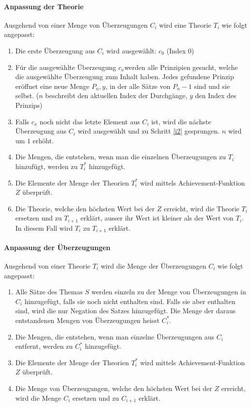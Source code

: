 \documentclass{article}
\begin{document}
\paragraph{Anpassung der Theorie}
Ausgehend von einer Menge von Überzeugungen $C_i$ wird eine Theorie $T_i$ wie folgt angepasst: 
\begin{enumerate}
    \item \label{i1} Die erste Überzeugung aus $C_i$ wird ausgewählt: $c_0$ (Index 0)
    \item \label{i2} Für die ausgewählte Überzeugung $c_x$werden alle Prinzipien gesucht, welche die ausgewählte Überzeugung zum Inhalt haben. Jedes gefundene Prinzip eröffnet eine neue Menge $P_n,y$, in der alle Sätze von $P_n-1$ sind und sie selbst. ($n$ beschreibt den aktuellen Index der Durchgänge, $y$ den Index des Prinzips)
    \item \label{i3} Falls $c_x$ noch nicht das letzte Element aus $C_i$ ist, wird die nächste Überzeugung aus $C_i$ wird ausgewählt und zu Schritt \ref{i2} gesprungen. $n$ wird um $1$ erhöht.
    \item \label{i3} Die Mengen, die entstehen, wenn man die einzelnen Überzeugungen zu $T_i$ hinzufügt, werden zu $T_i^*$ hinzugefügt.
    \item \label{i4}Die Elemente der Menge der Theorien $T_i^*$ wird mittels Achievement-Funktion $Z$ überprüft.
    \item \label{i5}Die Theorie, welche den höchsten Wert bei der $Z$ erreicht, wird die Theorie $T_i$ ersetzen und zu $T_{i+1}$ erklärt, ausser ihr Wert ist kleiner als der Wert von $T_i$. In diesem Fall wird $T_i$ zu $T_{i+1}$ erklärt.
\end{enumerate}

\paragraph{Anpassung der Überzeugungen}
Ausgehend von einer Theorie $T_i$ wird die Menge der Überzeugungen $C_i$ wie folgt angepasst:
\begin{enumerate}
    \item \label{i1} Alle Sätze des Themas $S$ werden einzeln zu der Menge von Überzeugungen in $C_i$ hinzugefügt, falls sie noch nicht enthalten sind. Falls sie aber enthalten sind, wird die nur Negation des Satzes hinzugefügt. Die Menge der daraus entstandenen Mengen von Überzeugungen heisst $C_i^*$.
    \item \label{i2} Die Mengen, die entstehen, wenn man einzelne Überzeugungen aus $C_i$ entfernt, werden zu $C_i^*$ hinzugefügt.
    \item \label{i3} Die Elemente der Menge der Theorien $T_i^*$ wird mittels Achievement-Funktion $Z$ überprüft.
    \item \label{i4}Die Menge von Überzeugungen, welche den höchsten Wert bei der $Z$ erreicht, wird die Menge $C_i$ ersetzen und zu $C_{i+1}$ erklärt.
\end{enumerate}

\newpage
\printbibliography
\end{document}
